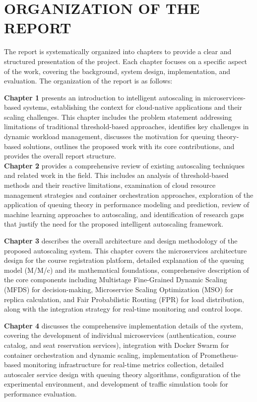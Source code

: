 \section{ORGANIZATION OF THE REPORT}

The report is systematically organized into chapters to provide a clear and structured presentation of the project. Each chapter focuses on a specific aspect of the work, covering the background, system design, implementation, and evaluation. The organization of the report is as follows:

\vspace{0.5cm}
\textbf{Chapter 1} presents an introduction to intelligent autoscaling in microservices-based systems, establishing the context for cloud-native applications and their scaling challenges. This chapter includes the problem statement addressing limitations of traditional threshold-based approaches, identifies key challenges in dynamic workload management, discusses the motivation for queuing theory-based solutions, outlines the proposed work with its core contributions, and provides the overall report structure.
\\

\vspace{0.4cm}
\textbf{Chapter 2} provides a comprehensive review of existing autoscaling techniques and related work in the field. This includes an analysis of threshold-based methods and their reactive limitations, examination of cloud resource management strategies and container orchestration approaches, exploration of the application of queuing theory in performance modeling and prediction, review of machine learning approaches to autoscaling, and identification of research gaps that justify the need for the proposed intelligent autoscaling framework.

\vspace{0.4cm}
\textbf{Chapter 3} describes the overall architecture and design methodology of the proposed autoscaling system. This chapter covers the microservices architecture design for the course registration platform, detailed explanation of the queuing model (M/M/c) and its mathematical foundations, comprehensive description of the core components including Multistage Fine-Grained Dynamic Scaling (MFDS) for decision-making, Microservice Scaling Optimization (MSO) for replica calculation, and Fair Probabilistic Routing (FPR) for load distribution, along with the integration strategy for real-time monitoring and control loops.

\vspace{0.4cm}
\textbf{Chapter 4} discusses the comprehensive implementation details of the system, covering the development of individual microservices (authentication, course catalog, and seat reservation services), integration with Docker Swarm for container orchestration and dynamic scaling, implementation of Prometheus-based monitoring infrastructure for real-time metrics collection, detailed autoscaler service design with queuing theory algorithms, configuration of the experimental environment, and development of traffic simulation tools for performance evaluation.\\

